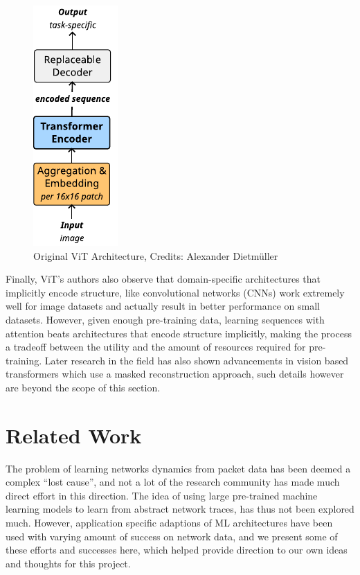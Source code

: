 \begin{figure}[!hbt]
  \begin{center}
    \includegraphics[scale=1.5]{figures/architecture_vit.pdf}
    \caption{Original ViT Architecture, Credits: Alexander Dietmüller}
    \label{fig:vit}
  \end{center}
\end{figure}


Finally, ViT's authors also observe that domain-specific architectures that implicitly encode structure, like convolutional networks (CNNs) work extremely well for image datasets and  actually result in better performance on small datasets. However, given enough pre-training data, learning sequences with attention beats architectures that encode structure implicitly, making the process a tradeoff between the utility and the amount of resources required for pre-training. Later research in the field has also shown advancements in vision based transformers which use a masked reconstruction approach\cite{heMaskedAutoencodersAre2021}, such details however are beyond the scope of this section. 


\section{Related Work}
\label{sec:related_work}

The problem of learning networks dynamics from packet data has been deemed a complex ``lost cause'',  and not a lot of the research community has made much direct effort in this direction. The idea of using large pre-trained machine learning models to learn from abstract network traces, has thus not been explored much. However, application specific adaptions of ML architectures have been used with varying amount of success on network data, and we present some of these efforts and successes here, which helped provide direction to our own ideas and thoughts for this project.


